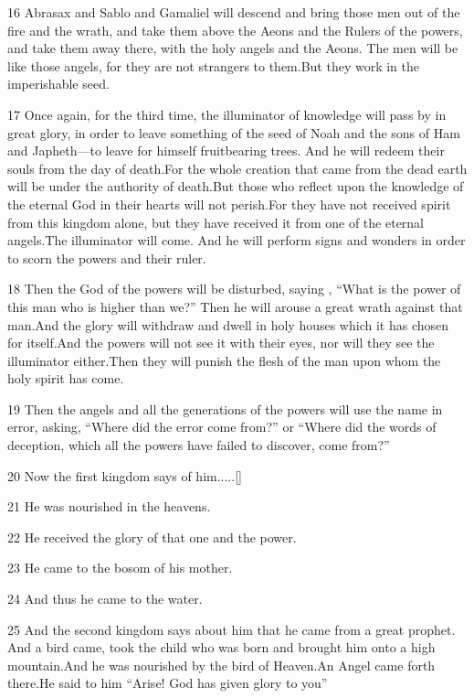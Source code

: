 \par 16 Abrasax and Sablo and Gamaliel will descend and bring those men out of the fire and the wrath, and take them above the Aeons and the Rulers of the powers, and take them away there, with the holy angels and the Aeons. The men will be like those angels, for they are not strangers to them.But they work in the imperishable seed.

\par 17 Once again, for the third time, the illuminator of knowledge will pass by in great glory, in order to leave something of the seed of Noah and the sons of Ham and Japheth—to leave for himself fruitbearing trees. And he will redeem their souls from the day of death.For the whole creation that came from the dead earth will be under the authority of death.But those who reflect upon the knowledge of the eternal God in their hearts will not perish.For they have not received spirit from this kingdom alone, but they have received it from one of the eternal angels.The illuminator will come. And he will perform signs and wonders in order to scorn the powers and their ruler.

\par 18 Then the God of the powers will be disturbed, saying , “What is the power of this man who is higher than we?” Then he will arouse a great wrath against that man.And the glory will withdraw and dwell in holy houses which it has chosen for itself.And the powers will not see it with their eyes, nor will they see the illuminator either.Then they will punish the flesh of the man upon whom the holy spirit has come.

\par 19 Then the angels and all the generations of the powers will use the name in error, asking, “Where did the error come from?” or “Where did the words of deception, which all the powers have failed to discover, come from?”

\par 20 Now the first kingdom says of him.....[]
\par 21 He was nourished in the heavens.
\par 22 He received the glory of that one and the power.
\par 23 He came to the bosom of his mother.
\par 24 And thus he came to the water.
\par 25 And the second kingdom says about him that he came from a great prophet. And a bird came, took the child who was born and brought him onto a high mountain.And he was nourished by the bird of Heaven.An Angel came forth there.He said to him “Arise! God has given glory to you”

